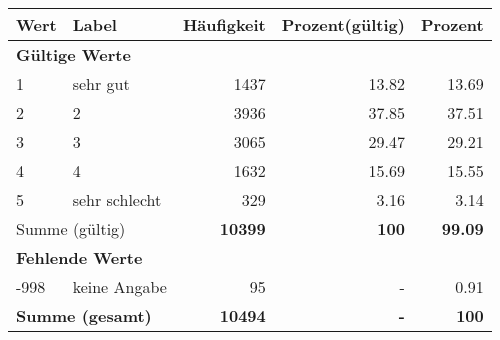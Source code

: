      \begin{longtable}{lXrrr}
     \toprule
     \textbf{Wert} & \textbf{Label} & \textbf{Häufigkeit} & \textbf{Prozent(gültig)} & \textbf{Prozent} \\
     \endhead
     \midrule
     \multicolumn{5}{l}{\textbf{Gültige Werte}}\\

     1 &
     \multicolumn{1}{X}{ sehr gut   } &


       \num{1437} &
       \num[round-mode=places,round-precision=2]{13,82} &
         \num[round-mode=places,round-precision=2]{13,69} \\

     2 &
     \multicolumn{1}{X}{ 2   } &


       \num{3936} &
       \num[round-mode=places,round-precision=2]{37,85} &
         \num[round-mode=places,round-precision=2]{37,51} \\

     3 &
     \multicolumn{1}{X}{ 3   } &


       \num{3065} &
       \num[round-mode=places,round-precision=2]{29,47} &
         \num[round-mode=places,round-precision=2]{29,21} \\

     4 &
     \multicolumn{1}{X}{ 4   } &


       \num{1632} &
       \num[round-mode=places,round-precision=2]{15,69} &
         \num[round-mode=places,round-precision=2]{15,55} \\

     5 &
     \multicolumn{1}{X}{ sehr schlecht   } &


       \num{329} &
       \num[round-mode=places,round-precision=2]{3,16} &
         \num[round-mode=places,round-precision=2]{3,14} \\
     \midrule
     \multicolumn{2}{l}{Summe (gültig)} &
       \textbf{\num{10399}} &
     \textbf{100} &
       \textbf{\num[round-mode=places,round-precision=2]{99,09}} \\
     \multicolumn{5}{l}{\textbf{Fehlende Werte}}\\
       -998 &
       keine Angabe &
         \num{95} &
        - &
         \num[round-mode=places,round-precision=2]{0,91} \\
     \midrule
     \multicolumn{2}{l}{\textbf{Summe (gesamt)}} &
          \textbf{\num{10494}} &
        \textbf{-} &
        \textbf{100} \\
     \bottomrule
     \end{longtable}
     
